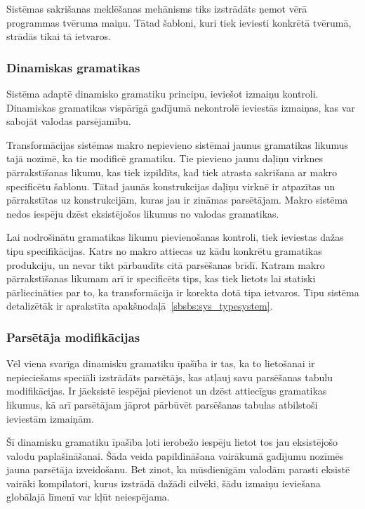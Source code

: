 Sistēmas sakrišanas meklēšanas mehānisms tiks izstrādāts ņemot vērā programmas tvēruma maiņu. Tātad šabloni, kuri tiek ieviesti konkrētā tvērumā, strādās tikai tā ietvaros.

\subsubsection{\label{sbsbs:sys_dynamicgrammars}Dinamiskas gramatikas}

Sistēma adaptē dinamisko gramatiku principu, ieviešot izmaiņu kontroli. Dinamiskas gramatikas vispārīgā gadījumā nekontrolē ieviestās izmaiņas, kas var sabojāt valodas parsējamību.

Transformācijas sistēmas makro nepievieno sistēmai jaunus gramatikas likumus tajā nozīmē, ka tie modificē gramatiku. Tie pievieno jaunu daļiņu virknes pārrakstīšanas likumu, kas tiek izpildīts, kad tiek atrasta sakrišana ar makro specificētu šablonu. Tātad jaunās konstrukcijas daļiņu virknē ir atpazītas un pārrakstītas uz konstrukcijām, kuras jau ir zināmas parsētājam. Makro sistēma nedos iespēju dzēst eksistējošos likumus no valodas gramatikas.

Lai nodrošinātu gramatikas likumu pievienošanas kontroli, tiek ieviestas dažas tipu specifikācijas. Katrs no makro attiecas uz kādu konkrētu gramatikas produkciju, un nevar tikt pārbaudīts citā parsēšanas brīdī. Katram makro pārrakstīšanas likumam arī ir specificēts tips, kas tiek lietots lai statiski pārliecināties par to, ka transformācija ir korekta dotā tipa ietvaros. Tipu sistēma detalizētāk ir aprakstīta apakšnodaļā~\ref{sbsbs:sys_typesystem}.

\subsubsection{\label{sbsbs:sys_parsermodifications}Parsētāja modifikācijas}

Vēl viena svarīga dinamisku gramatiku īpašība ir tas, ka to lietošanai ir nepieciešams speciāli izstrādāts parsētājs, kas atļauj savu parsēšanas tabulu modifikācijas. Ir jāeksistē iespējai pievienot un dzēst attiecīgus gramatikas likumus, kā arī parsētājam jāprot pārbūvēt parsēšanas tabulas atbilstoši ieviestām izmaiņām.

Šī dinamisku gramatiku īpašība ļoti ierobežo iespēju lietot tos jau eksistējošo valodu paplašināšanai. Šāda veida papildināšana vairākumā gadījumu nozīmēs jauna parsētāja izveidošanu. Bet zinot, ka mūsdienīgām valodām parasti eksistē vairāki kompilatori, kurus izstrādā dažādi cilvēki, šādu izmaiņu ieviešana globālajā līmenī var kļūt neiespējama.

